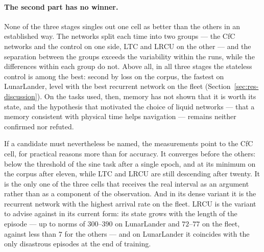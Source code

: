 \paragraph{The second part has no winner.}
None of the three stages singles out one cell as better than the others in an
established way. The networks split each time into two groups --- the CfC
networks and the control on one side, LTC and LRCU on the other --- and the
separation between the groups exceeds the variability within the runs, while
the differences within each group do not. Above all, in all three stages the
stateless control is among the best: second by loss on the corpus, the fastest
on LunarLander, level with the best recurrent network on the fleet
(Section~\ref{sec:res-discussion}). On the tasks used, then, memory has not
shown that it is worth its state, and the hypothesis that motivated the choice
of liquid networks --- that a memory consistent with physical time helps
navigation --- remains neither confirmed nor refuted.

If a candidate must nevertheless be named, the measurements point to the CfC
cell, for practical reasons more than for accuracy. It converges before the
others: below the threshold of the sine task after a single epoch, and at its
minimum on the corpus after eleven, while LTC and LRCU are still descending
after twenty. It is the only one of the three cells that receives the real
interval as an argument rather than as a component of the observation. And in
its dense variant it is the recurrent network with the highest arrival rate on
the fleet. LRCU is the variant to advise against in its current form: its state
grows with the length of the episode --- up to norms of $300$--$390$ on
LunarLander and $72$--$77$ on the fleet, against less than $7$ for the others
--- and on LunarLander it coincides with the only disastrous episodes at the
end of training.

